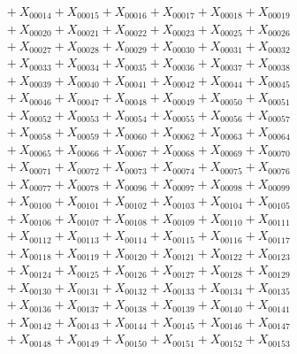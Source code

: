 \documentclass[a4paper,10pt]{article}
\begin{document}
{\begin{align}
&\quad  + X_{00014} + X_{00015} + X_{00016} + X_{00017} + X_{00018} + X_{00019} \\[0.5ex]
&\quad  + X_{00020} + X_{00021} + X_{00022} + X_{00023} + X_{00025} + X_{00026} \\[0.5ex]
&\quad  + X_{00027} + X_{00028} + X_{00029} + X_{00030} + X_{00031} + X_{00032} \\[0.5ex]
&\quad  + X_{00033} + X_{00034} + X_{00035} + X_{00036} + X_{00037} + X_{00038} \\[0.5ex]
&\quad  + X_{00039} + X_{00040} + X_{00041} + X_{00042} + X_{00044} + X_{00045} \\[0.5ex]
&\quad  + X_{00046} + X_{00047} + X_{00048} + X_{00049} + X_{00050} + X_{00051} \\[0.5ex]
&\quad  + X_{00052} + X_{00053} + X_{00054} + X_{00055} + X_{00056} + X_{00057} \\[0.5ex]
&\quad  + X_{00058} + X_{00059} + X_{00060} + X_{00062} + X_{00063} + X_{00064} \\[0.5ex]
&\quad  + X_{00065} + X_{00066} + X_{00067} + X_{00068} + X_{00069} + X_{00070} \\[0.5ex]
&\quad  + X_{00071} + X_{00072} + X_{00073} + X_{00074} + X_{00075} + X_{00076} \\[0.5ex]
&\quad  + X_{00077} + X_{00078} + X_{00096} + X_{00097} + X_{00098} + X_{00099} \\[0.5ex]
&\quad  + X_{00100} + X_{00101} + X_{00102} + X_{00103} + X_{00104} + X_{00105} \\[0.5ex]
&\quad  + X_{00106} + X_{00107} + X_{00108} + X_{00109} + X_{00110} + X_{00111} \\[0.5ex]
&\quad  + X_{00112} + X_{00113} + X_{00114} + X_{00115} + X_{00116} + X_{00117} \\[0.5ex]
&\quad  + X_{00118} + X_{00119} + X_{00120} + X_{00121} + X_{00122} + X_{00123} \\[0.5ex]
&\quad  + X_{00124} + X_{00125} + X_{00126} + X_{00127} + X_{00128} + X_{00129} \\[0.5ex]
&\quad  + X_{00130} + X_{00131} + X_{00132} + X_{00133} + X_{00134} + X_{00135} \\[0.5ex]
&\quad  + X_{00136} + X_{00137} + X_{00138} + X_{00139} + X_{00140} + X_{00141} \\[0.5ex]
&\quad  + X_{00142} + X_{00143} + X_{00144} + X_{00145} + X_{00146} + X_{00147} \\[0.5ex]
&\quad  + X_{00148} + X_{00149} + X_{00150} + X_{00151} + X_{00152} + X_{00153} \\[0.5ex]

\end{align}}
\end{document}
